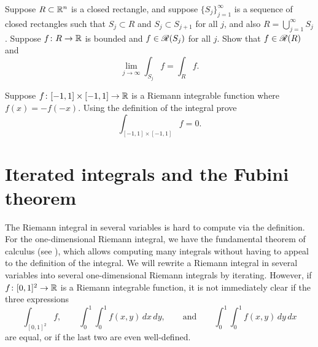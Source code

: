 \begin{exercise}
Suppose $R \subset {\mathbb{R}}^n$ is a closed rectangle, and suppose $\{ S_j \}_{j=1}^\infty$ is a
sequence of closed rectangles
such that $S_j \subset R$ and $S_j \subset S_{j+1}$ for all $j$, and
also $R = \bigcup_{j=1}^\infty S_j$.
Suppose $f \colon R \to {\mathbb{R}}$ is bounded and $f \in {\mathscr{R}}(S_j)$ for all $j$.
Show that $f \in {\mathscr{R}}(R)$ and
\begin{equation*}
\lim_{j\to\infty} \int_{S_j} f = \int_R f .
\end{equation*}
\end{exercise}

\begin{exercise}
Suppose $f\colon [-1,1] \times [-1,1] \to {\mathbb{R}}$ is a Riemann
integrable function where $f(x) = -f(-x)$.
Using the definition of the integral prove
\begin{equation*}
\int_{[-1,1] \times [-1,1]} f = 0 .
\end{equation*}
\end{exercise}


\sectionnewpage
\section{Iterated integrals and the Fubini theorem}
\label{sec:iteratedints}


The Riemann integral in several variables
is hard to compute via the definition.
For the one-dimensional Riemann integral, we have the fundamental
theorem of calculus (see 
),
which allows computing many integrals without
having to appeal to the definition of the integral.
We will rewrite 
a Riemann integral in several variables into
several one-dimensional Riemann integrals
by iterating.  However, if $f \colon [0,1]^2 \to {\mathbb{R}}$ is a Riemann integrable
function, it is not immediately clear if the three expressions
\begin{equation*}
\int_{[0,1]^2} f ,
\qquad
\int_0^1 \int_0^1 f(x,y) \, dx \, dy ,
\qquad \text{and}
\qquad
\int_0^1 \int_0^1 f(x,y) \, dy \, dx
\end{equation*}
are equal, or if the last two are even well-defined.

